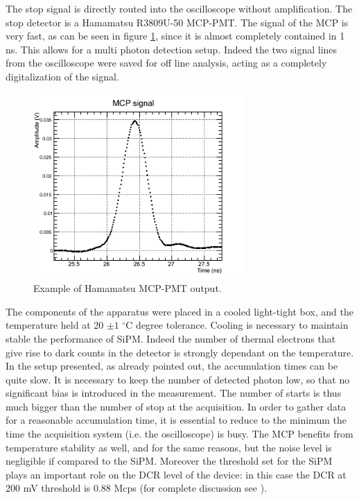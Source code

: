 The stop signal is directly routed into the oscilloscope without amplification. The stop detector is a Hamamatsu R3809U-50 MCP-PMT.
The signal of the MCP is very fast, as can be seen in figure \ref{fig:MCP_sign}, since it is almost completely contained in 1 ns. This allows for a multi photon detection setup.
Indeed the two signal lines from the oscilloscope were saved for off line analysis, acting as a completely digitalization of the signal.
\begin{figure}[htbp]
\begin{center}
\includegraphics[width=8cm]{../Pictures/Chapter_8/MCP_signal.png}
\end{center}
\caption[MCP signal sample]{Example of Hamamatsu MCP-PMT output.}
\label{fig:MCP_sign}
\end{figure}
The components of the apparatus were placed in a cooled light-tight box, and the temperature held at 20 $\pm 1$ $^{\circ}$C degree tolerance.
Cooling is necessary to maintain stable the performance of SiPM. Indeed the number of thermal electrons that give rise to dark counts in the detector is strongly dependant on the temperature.
In the setup presented, as already pointed out, the accumulation times can be quite slow. It is necessary to keep the number of detected photon low, so that no significant bias is introduced in the measurement. The number of starts is thus much bigger than the number of stop at the acquisition. In order to gather data for a reasonable accumulation time, it is essential to reduce to the minimum the time the acquisition system (i.e. the oscilloscope) is busy.
The MCP benefits from temperature stability as well, and for the same reasons, but the noise level is negligible if compared to the SiPM.
Moreover the threshold set for the SiPM plays an important role on the DCR level of the device: in this case the DCR at 200 mV threshold is 0.88 Mcps (for complete discussion see \cite{Gundacker2014}). 

